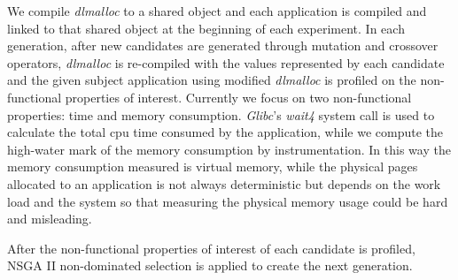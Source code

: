 We compile \emph{dlmalloc} to a shared object and each application is compiled and linked to that shared object at the beginning of each experiment. In each generation, after new candidates are generated through mutation and crossover operators, \emph{dlmalloc} is re-compiled with the values represented by each candidate and the given subject application using modified \emph{dlmalloc} is profiled on the non-functional properties of interest.
Currently we focus on two non-functional properties: time and memory consumption. \emph{Glibc}'s \emph{wait4} system call is used to calculate the total cpu time consumed by the application, while we compute the high-water mark of the memory consumption by instrumentation. In this way the memory consumption measured is virtual memory, while the physical pages allocated to an application is not always deterministic but depends on the work load and the system so that measuring the physical memory usage could be hard and misleading.

After the non-functional properties of interest of each candidate is profiled, NSGA II non-dominated selection is applied to create the next generation.

